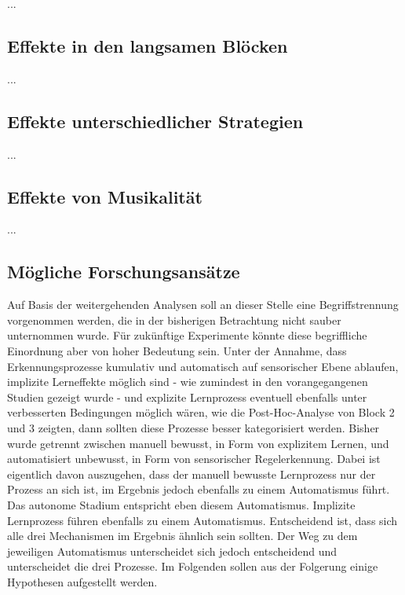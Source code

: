 \documentclass[doc,a4paper,12pt]{apa6}
\begin{document}
...

\subsection{Effekte in den langsamen Blöcken}

...


\subsection{Effekte unterschiedlicher Strategien}

...

\subsection{Effekte von Musikalität}

...

\subsection{Mögliche Forschungsansätze}

Auf Basis der weitergehenden Analysen soll an dieser Stelle eine Begriffstrennung vorgenommen werden, die in der bisherigen Betrachtung nicht sauber unternommen wurde. Für zukünftige Experimente könnte diese begriffliche Einordnung aber von hoher Bedeutung sein. Unter der Annahme, dass Erkennungsprozesse kumulativ und automatisch auf sensorischer Ebene ablaufen, implizite Lerneffekte möglich sind - wie zumindest in den vorangegangenen Studien gezeigt wurde - und explizite Lernprozess eventuell ebenfalls unter verbesserten Bedingungen möglich wären, wie die Post-Hoc-Analyse von Block 2 und 3 zeigten, dann sollten diese Prozesse besser kategorisiert werden. Bisher wurde getrennt zwischen manuell bewusst, in Form von explizitem Lernen, und automatisiert unbewusst, in Form von sensorischer Regelerkennung. Dabei ist eigentlich davon auszugehen, dass der manuell bewusste Lernprozess nur der Prozess an sich ist, im Ergebnis jedoch ebenfalls zu einem Automatismus führt. Das autonome Stadium entspricht eben diesem Automatismus. Implizite Lernprozess führen ebenfalls zu einem Automatismus. Entscheidend ist, dass sich alle drei Mechanismen im Ergebnis ähnlich sein sollten. Der Weg zu dem jeweiligen Automatismus unterscheidet sich jedoch entscheidend und unterscheidet die drei Prozesse. Im Folgenden sollen aus der Folgerung einige Hypothesen aufgestellt werden.
\end{document}

